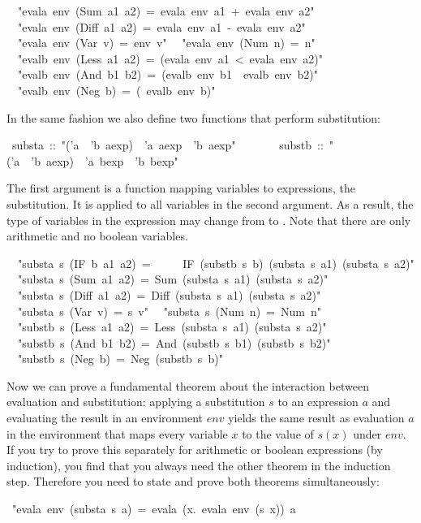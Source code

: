 \begin{isabelle}
~~{"}evala~env~(Sum~a1~a2)~=~evala~env~a1~+~evala~env~a2{"}\isanewline
~~{"}evala~env~(Diff~a1~a2)~=~evala~env~a1~-~evala~env~a2{"}\isanewline
~~{"}evala~env~(Var~v)~=~env~v{"}\isanewline
~~{"}evala~env~(Num~n)~=~n{"}\isanewline
\isanewline
~~{"}evalb~env~(Less~a1~a2)~=~(evala~env~a1~<~evala~env~a2){"}\isanewline
~~{"}evalb~env~(And~b1~b2)~=~(evalb~env~b1~{\isasymand}~evalb~env~b2){"}\isanewline
~~{"}evalb~env~(Neg~b)~=~({\isasymnot}~evalb~env~b){"}%
\begin{isamarkuptext}%
\noindent
In the same fashion we also define two functions that perform substitution:%
\end{isamarkuptext}%
~substa~::~{"}('a~{\isasymRightarrow}~'b~aexp)~{\isasymRightarrow}~'a~aexp~{\isasymRightarrow}~'b~aexp{"}\isanewline
~~~~~~~substb~::~{"}('a~{\isasymRightarrow}~'b~aexp)~{\isasymRightarrow}~'a~bexp~{\isasymRightarrow}~'b~bexp{"}%
\begin{isamarkuptext}%
\noindent
The first argument is a function mapping variables to expressions, the
substitution. It is applied to all variables in the second argument. As a
result, the type of variables in the expression may change from 
to . Note that there are only arithmetic and no boolean variables.%
\end{isamarkuptext}%
\isanewline
~~{"}substa~s~(IF~b~a1~a2)~=\isanewline
~~~~~IF~(substb~s~b)~(substa~s~a1)~(substa~s~a2){"}\isanewline
~~{"}substa~s~(Sum~a1~a2)~=~Sum~(substa~s~a1)~(substa~s~a2){"}\isanewline
~~{"}substa~s~(Diff~a1~a2)~=~Diff~(substa~s~a1)~(substa~s~a2){"}\isanewline
~~{"}substa~s~(Var~v)~=~s~v{"}\isanewline
~~{"}substa~s~(Num~n)~=~Num~n{"}\isanewline
\isanewline
~~{"}substb~s~(Less~a1~a2)~=~Less~(substa~s~a1)~(substa~s~a2){"}\isanewline
~~{"}substb~s~(And~b1~b2)~=~And~(substb~s~b1)~(substb~s~b2){"}\isanewline
~~{"}substb~s~(Neg~b)~=~Neg~(substb~s~b){"}%
\begin{isamarkuptext}%
Now we can prove a fundamental theorem about the interaction between
evaluation and substitution: applying a substitution $s$ to an expression $a$
and evaluating the result in an environment $env$ yields the same result as
evaluation $a$ in the environment that maps every variable $x$ to the value
of $s(x)$ under $env$. If you try to prove this separately for arithmetic or
boolean expressions (by induction), you find that you always need the other
theorem in the induction step. Therefore you need to state and prove both
theorems simultaneously:%
\end{isamarkuptext}%
~{"}evala~env~(substa~s~a)~=~evala~({\isasymlambda}x.~evala~env~(s~x))~a~{\isasymand}\isanewline

\end{isabelle}
